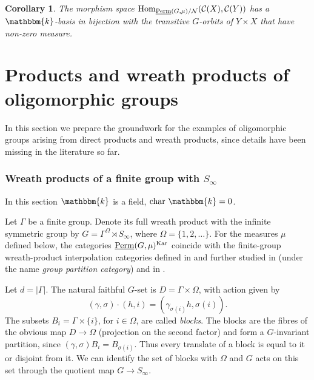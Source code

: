 \documentclass[11pt,a4paper]{amsart}
\theoremstyle{plain}%
\newtheorem{corollary}[lemma]{Corollary}
\theoremstyle{definition}
\theoremstyle{remark}
\newcommand{\Hom}{\operatorname{Hom}}
\newcommand{\Perm}{\underline{{\rm Perm}}}
\newcommand{\kk}{\mathbbm{k}}
\newcommand{\Kar}{\mathrm{Kar}}
\begin{document}
\begin{corollary}
    \label{lem:negl-basis}
The morphism space $\Hom_{\Perm(G, \mu)/ \mathcal{N}}(\mathcal{C}(X),\mathcal{C}(Y))$ has a $\kk$-basis in bijection with the transitive $G$-orbits of $Y \times X$ that have non-zero measure.
\end{corollary}
















\part{Products and wreath products of oligomorphic groups}

In this section we prepare the groundwork for the examples of oligomorphic groups arising from direct products and wreath products, since details have been missing in the literature so far.

\section{Wreath products of a finite group with \texorpdfstring{$S_\infty$}{the infinite symmetric group}}\label{sec:wreath-products_intro}

In this section $\kk$ is a field, $\mathrm{char}~\kk=0$. 

Let $\Gamma$ be a finite group. Denote its full wreath product with the infinite symmetric group by
$G=\Gamma^{\Omega}\rtimes S_\infty$, where $\Omega=\{1,2,\ldots\}$. For the measures $\mu$ defined below, the categories $\Perm(G,\mu)^{\Kar}$  coincide with the finite-group wreath-product interpolation categories defined in \cite{Knop} and further studied in \cite{Nyobe-Savage} (under the name \emph{group partition category}) and in \cite{FHH}.
 


Let $d=|\Gamma|$. The natural faithful $G$-set is
$D=\Gamma\times\Omega$, with action given by
\[
  (\gamma,\sigma)\cdot(h,i)
  =(\gamma_{\sigma(i)}h,\sigma(i)).
\]
The subsets $B_i=\Gamma\times\{i\}$, for $i\in\Omega$, are called
\emph{blocks}. The blocks are the fibres of the obvious map $D\to\Omega$ (projection on the second factor) and form a
$G$-invariant partition, since $(\gamma,\sigma)B_i=B_{\sigma(i)}$.
Thus every translate of a block is equal to it or disjoint from it.
We can identify the set of blocks with $\Omega$ and $G$ acts on this set through
the quotient map $G\to S_\infty$.
\end{document}
